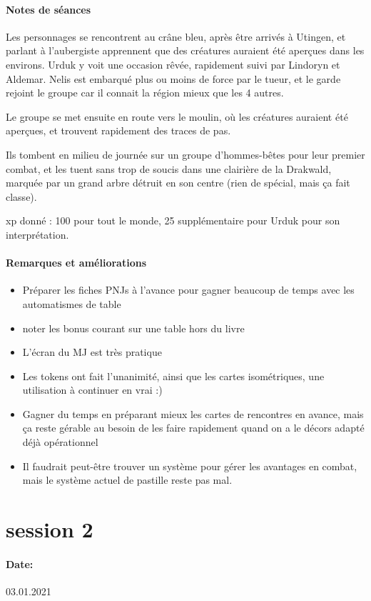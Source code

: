 \documentclass[10pt,a4paper]{book}
\begin{document}
\paragraph{Notes de séances}
Les personnages se rencontrent au crâne bleu, après être arrivés à Utingen, et parlant à l'aubergiste apprennent que des créatures auraient été aperçues dans les environs. Urduk y voit une occasion rêvée, rapidement suivi par Lindoryn et Aldemar. Nelis est embarqué plus ou moins de force par le tueur, et le garde rejoint le groupe car il connait la région mieux que les 4 autres.

Le groupe se met ensuite en route vers le moulin, où les créatures auraient été aperçues, et trouvent rapidement des traces de pas.

Ils tombent en milieu de journée sur un groupe d'hommes-bêtes pour leur premier combat, et les tuent sans trop de soucis dans une clairière de la Drakwald, marquée par un grand arbre détruit en son centre (rien de spécial, mais ça fait classe).

xp donné : 100 pour tout le monde, 25 supplémentaire pour Urduk pour son interprétation.

\paragraph{Remarques et améliorations} 
\begin{itemize}
\item Préparer les fiches PNJs à l'avance pour gagner beaucoup de temps avec les automatismes de table
\item noter les bonus courant sur une table hors du livre
\item L'écran du MJ est très pratique
\item Les tokens ont fait l'unanimité, ainsi que les cartes isométriques, une utilisation à continuer en vrai :)
\item Gagner du temps en préparant mieux les cartes de rencontres en avance, mais ça reste gérable au besoin de les faire rapidement quand on a le décors adapté déjà opérationnel
\item Il faudrait peut-être trouver un système pour gérer les avantages en combat, mais le système actuel de pastille reste pas mal.
\end{itemize}
\section{session 2}
\paragraph{Date:} 03.01.2021
\end{document}
